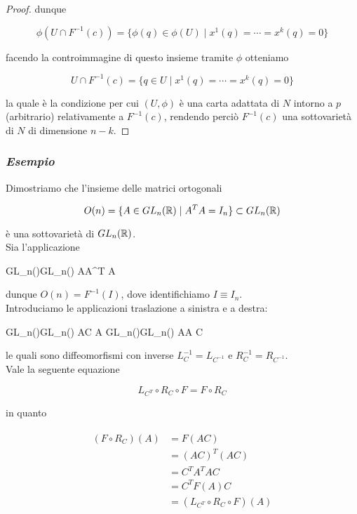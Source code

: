\begin{proof}
	dunque
	
	\begin{equation}
		\phi( U \cap F^{-1}(c) ) = \{ \phi(q) \in \phi(U) \mid x^{1}(q) = \cdots = x^{k}(q) = 0 \}
	\end{equation}

	facendo la controimmagine di questo insieme tramite $ \phi $ otteniamo
	
	\begin{equation}
		U \cap F^{-1}(c) = \{ q \in U \mid x^{1}(q) = \cdots = x^{k}(q) = 0 \}
	\end{equation}

	la quale è la condizione per cui $ (U,\phi) $ è una carta adattata di $ N $ intorno a $ p $ (arbitrario) relativamente a $ F^{-1}(c) $, rendendo perciò $ F^{-1}(c) $ una sottovarietà di $ N $ di dimensione $ n-k $.
\end{proof}

\subsubsection{\textit{Esempio}}

Dimostriamo che l'insieme delle matrici ortogonali

\begin{equation}
	O(n) = \{ A \in GL_{n}(\mathbb{R}) \mid A^{T} A = I_{n} \} \subset GL_{n}(\mathbb{R})
\end{equation}

è una sottovarietà di $ GL_{n}(\mathbb{R}) $.\\
Sia l'applicazione

	{GL_{n}(\R)}{GL_{n}(\R)}
	{A}{A^{T} A}

dunque $ O(n) = F^{-1}(I) $, dove identifichiamo $ I \equiv I_{n} $.\\
Introduciamo le applicazioni traslazione a sinistra e a destra:

	{GL_{n}(\R)}{GL_{n}(\R)}
	{A}{C A}
%
	{GL_{n}(\R)}{GL_{n}(\R)}
	{A}{A C}

le quali sono diffeomorfismi con inverse $ L_{C}^{-1} = L_{C^{-1}} $ e $ R_{C}^{-1} = R_{C^{-1}} $.\\
Vale la seguente equazione

\begin{equation}
	L_{C^{T}} \circ R_{C} \circ F = F \circ R_{C}
\end{equation}

in quanto

\begin{align}
	\begin{split}
		(F \circ R_{C})(A) &= F(AC)\\
		&= (AC)^{T} (AC)\\
		&= C^{T} A^{T} A C\\
		&= C^{T} F(A) C\\
		&= (L_{C^{T}} \circ R_{C} \circ F)(A)
	\end{split}
\end{align}

